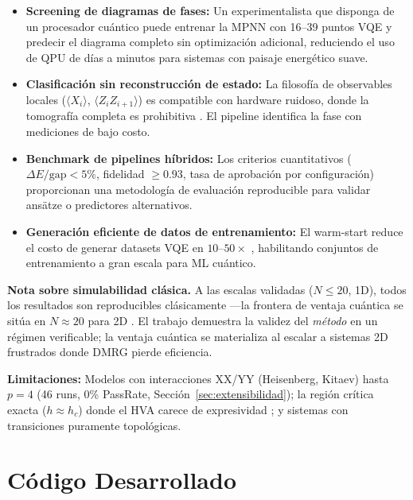 \documentclass[11pt,a4paper,spanish]{book}
\begin{document}
\begin{itemize}
    \item \textbf{Screening de diagramas de fases:} Un experimentalista que disponga de un procesador cuántico puede entrenar la MPNN con 16--39 puntos VQE y predecir el diagrama completo sin optimización adicional, reduciendo el uso de QPU de días a minutos para sistemas con paisaje energético suave.

    \item \textbf{Clasificación sin reconstrucción de estado:} La filosofía de observables locales ($\langle X_i \rangle$, $\langle Z_i Z_{i+1} \rangle$) es compatible con hardware ruidoso, donde la tomografía completa es prohibitiva \citep{sharma2026}. El pipeline identifica la fase con mediciones de bajo costo.

    \item \textbf{Benchmark de pipelines híbridos:} Los criterios cuantitativos ($\Delta E/\text{gap} < 5\%$, fidelidad $\geq 0.93$, tasa de aprobación por configuración) proporcionan una metodología de evaluación reproducible para validar ansätze o predictores alternativos.

    \item \textbf{Generación eficiente de datos de entrenamiento:} El warm-start reduce el costo de generar datasets VQE en $10$--$50\times$ \citep{puig2025}, habilitando conjuntos de entrenamiento a gran escala para ML cuántico.
\end{itemize}

\textbf{Nota sobre simulabilidad clásica.} A las escalas validadas ($N \leq 20$, 1D), todos los resultados son reproducibles clásicamente ---la frontera de ventaja cuántica se sitúa en $N \approx 20$ para 2D \citep{martin2026}. El trabajo demuestra la validez del \emph{método} en un régimen verificable; la ventaja cuántica se materializa al escalar a sistemas 2D frustrados donde DMRG pierde eficiencia.

\textbf{Limitaciones:} Modelos con interacciones XX/YY (Heisenberg, Kitaev) hasta $p = 4$ (46 runs, 0\% PassRate, Sección~\ref{sec:extensibilidad}); la región crítica exacta ($h \approx h_c$) donde el HVA carece de expresividad \citep{tripathi2026, sumeet2025}; y sistemas con transiciones puramente topológicas.

\section{Código Desarrollado}
\label{sec:codigo}
\end{document}
